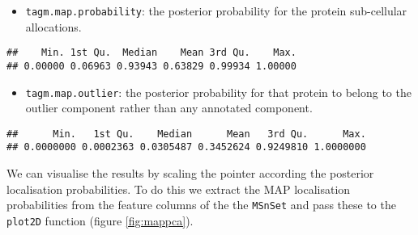 \documentclass[9pt,a4paper,]{extarticle}
\newenvironment{Shaded}{\begin{snugshade}}{\end{snugshade}}
\newcommand{\CommentTok}[1]{\textcolor[rgb]{0.56,0.35,0.01}{\textit{#1}}}
\newcommand{\DataTypeTok}[1]{\textcolor[rgb]{0.13,0.29,0.53}{#1}}
\newcommand{\FloatTok}[1]{\textcolor[rgb]{0.00,0.00,0.81}{#1}}
\newcommand{\KeywordTok}[1]{\textcolor[rgb]{0.13,0.29,0.53}{\textbf{#1}}}
\newcommand{\NormalTok}[1]{#1}
\newcommand{\OperatorTok}[1]{\textcolor[rgb]{0.81,0.36,0.00}{\textbf{#1}}}
\newcommand{\StringTok}[1]{\textcolor[rgb]{0.31,0.60,0.02}{#1}}
\begin{document}
\begin{itemize}
\item
  \texttt{tagm.map.probability}: the posterior probability for the protein
  sub-cellular allocations.
\end{itemize}

\begin{Shaded}
\end{Shaded}

\begin{verbatim}
##    Min. 1st Qu.  Median    Mean 3rd Qu.    Max. 
## 0.00000 0.06963 0.93943 0.63829 0.99934 1.00000
\end{verbatim}

\begin{itemize}
\item
  \texttt{tagm.map.outlier}: the posterior probability for that protein to
  belong to the outlier component rather than any annotated component.
\end{itemize}

\begin{Shaded}
\end{Shaded}

\begin{verbatim}
##      Min.   1st Qu.    Median      Mean   3rd Qu.      Max. 
## 0.0000000 0.0002363 0.0305487 0.3452624 0.9249810 1.0000000
\end{verbatim}

We can visualise the results by scaling the pointer according the
posterior localisation probabilities. To do this we extract the MAP
localisation probabilities from the feature columns of the the
\texttt{MSnSet} and pass these to the \texttt{plot2D} function (figure \ref{fig:mappca}).

\begin{Shaded}
\end{Shaded}
\end{document}

